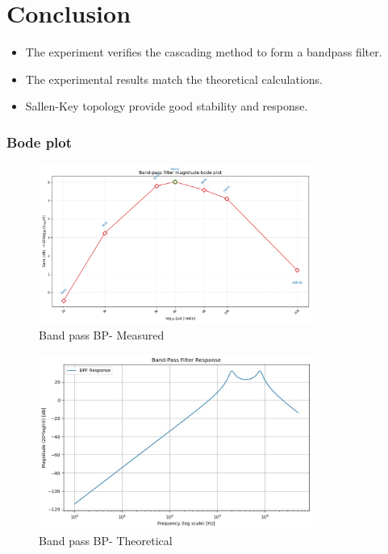 \documentclass[a4paper,12pt]{article}
\begin{document}
\section{Conclusion}
\begin{itemize}
    \item The experiment verifies the cascading method to form a bandpass filter.
    \item The experimental results match the theoretical calculations.
    \item Sallen-Key topology provide good stability and response.
\end{itemize}

\subsubsection{Bode plot}

\begin{figure}[H]
    \centering
    \includegraphics[width=0.8\textwidth]{fig/bpb.png}
    \caption{Band pass BP- Measured}
    \label{fig:your-label}
\end{figure}

\begin{figure}[H]
    \centering
    \includegraphics[width=0.8\textwidth]{bpfp.jpeg}
    \caption{Band pass BP- Theoretical}
    \label{fig:your-label}
\end{figure}
\end{document}
